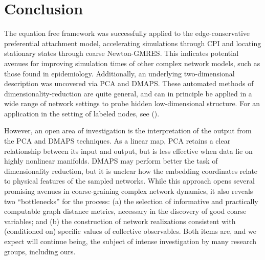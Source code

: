   \section{Conclusion}

  The equation free framework was successfully applied to the
  edge-conservative preferential attachment model, accelerating
  simulations through CPI and locating stationary states through
  coarse Newton-GMRES. This indicates potential avenues for improving
  simulation times of other complex network models, such as those
  found in epidemiology.
  Additionally, an underlying two-dimensional description was
  uncovered via PCA and DMAPS. These automated methods of
  dimensionality-reduction are quite general, and can in principle be
  applied in a wide range of network settings to probe hidden
  low-dimensional structure. For an application in the setting of
  labeled nodes, see ({\cite{kattis_modeling_2016}}).

  However, an open area of investigation is the interpretation of the
  output from the PCA and DMAPS techniques.
  As a linear map, PCA retains a clear relationship between its input
  and output, but is less effective when data lie on highly nonlinear
  manifolds.
  DMAPS may perform better the task of dimensionality reduction, but
  it is unclear how the embedding coordinates relate to physical
  features of the sampled networks.
  While this approach opens several promising avenues in
  coarse-graining complex network dynamics, it also reveals two
  ``bottlenecks'' for the process: (a) the selection of informative
  and practically computable graph distance metrics, necessary in the
  discovery of good coarse variables; and (b) the construction of
  network realizations consistent with (conditioned on) specific
  values of collective observables.
  Both items are, and we expect will continue being, the subject of
  intense investigation by many research groups, including ours.
